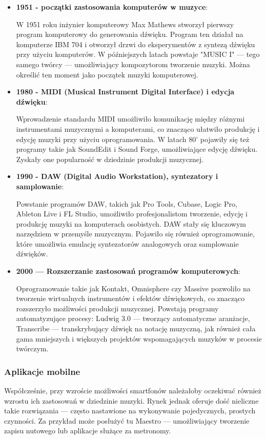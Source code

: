 \documentclass[12pt]{article}
\begin{document}
\begin{itemize}
	\item \textbf{1951 - początki zastosowania komputerów w muzyce}:
	      
	      W 1951 roku inżynier komputerowy Max Mathews stworzył pierwszy program komputerowy do generowania dźwięku.
	      Program ten działał na komputerze IBM 704 i otworzył drzwi do eksperymentów z syntezą dźwięku przy użyciu komputerów.
	      W późniejszych latach powstaje "MUSIC I" — tego samego twórcy — umożliwiający kompozytorom tworzenie muzyki.
	      Można określić ten moment jako początek muzyki komputerowej.
	\item \textbf{1980 - MIDI (Musical Instrument Digital Interface) i edycja dźwięku}:
	      
	      Wprowadzenie standardu MIDI umożliwiło komunikację między różnymi instrumentami muzycznymi a komputerami,
	      co znacząco ułatwiło produkcję i edycję muzyki przy użyciu oprogramowania.
	      W latach 80' pojawiły się też programy takie jak SoundEdit i Sound Forge, umożliwiające edycję dźwięku.
	      Zyskały one popularność w dziedzinie produkcji muzycznej.
	\item \textbf{1990 - DAW (Digital Audio Workstation), syntezatory i samplowanie}:
	      
	      Powstanie programów DAW, takich jak Pro Tools, Cubase, Logic Pro, Ableton Live i FL Studio,
	      umożliwiło profesjonalistom tworzenie, edycję i produkcję muzyki na komputerach osobistych.
	      DAW stały się kluczowym narzędziem w przemyśle muzycznym.
	      Pojawiło się również oprogramowanie, które umożliwia emulację syntezatorów analogowych oraz samplowanie dźwięków.
	\item \textbf{2000 — Rozszerzanie zastosowań programów komputerowych}:
	      
	      Oprogramowanie takie jak Kontakt, Omnisphere czy Massive pozwoliło na tworzenie wirtualnych instrumentów i efektów
	      dźwiękowych, co znacząco rozszerzyło możliwości produkcji muzycznej.
	      Powstają programy automatyzujące procesy: Ludwig 3.0 — tworzący automatyczne aranżacje, Transcribe — transkrybujący
	      dźwięk na notację muzyczną, jak również cała gama mniejszych i większych projektów wspomagających muzyków w procesie
	      twórczym.
\end{itemize}

\subsubsection{Aplikacje mobilne}
Współcześnie, przy wzroście możliwości smartfonów należałoby oczekiwać również wzrostu ich zastosowań w dziedzinie
muzyki. Rynek jednak oferuje dość nieliczne takie rozwiązania — często nastawione na wykonywanie pojedycznych,
prostych czynności. Za przykład może posłużyć tu Maestro — umożliwiający tworzenie zapisu nutowego lub aplikacje
służące za metronomy.
\end{document}
